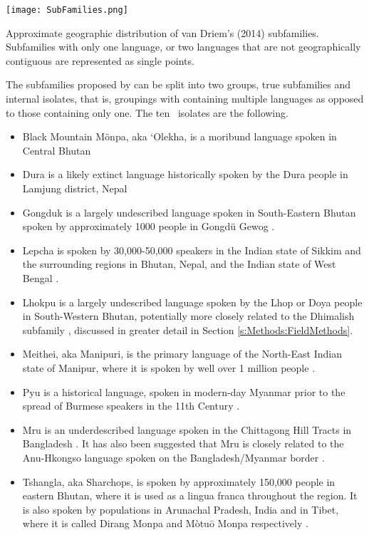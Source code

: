 \begin{map}

\centering
\texttt{[image: SubFamilies.png]}
\caption{Approximate geographic distribution of van Driem's (2014) subfamilies. Subfamilies with only one language, or two languages that are not geographically contiguous are represented as single points.}
\label{fig:SubFamMap}
\end{map}

The subfamilies proposed by  can be split into two groups, true subfamilies and internal isolates, that is, groupings with containing multiple languages as opposed to those containing only one. The ten \lfam\ isolates are the following.


\begin{itemize}
    \item Black Mountain Mönpa, aka `Olekha, is a moribund language spoken in Central Bhutan \cites{vanDriem1995}{Hyslop2016}
    \item Dura is a likely extinct language historically spoken by the Dura people in Lamjung district, Nepal \cite{Schorer2016}
    \item Gongduk is a largely undescribed language spoken in South-Eastern Bhutan spoken by approximately 1000 people in Gongdü Gewog \cite{Bodt2012}.
    \item Lepcha is spoken by 30,000-50,000 speakers in the Indian state of Sikkim and the surrounding regions in Bhutan, Nepal, and the Indian state of West Bengal \cite{Plaisier2007}.
    \item Lhokpu is a largely undescribed language spoken by the Lhop or Doya people in South-Western Bhutan, potentially more closely related to the Dhimalish subfamily \cites{Bodt2012}{Grollmann2018}, discussed in greater detail in Section \ref{s:Methods:FieldMethods}.
    \item Meithei, aka Manipuri, is the primary language of the North-East Indian state of Manipur, where it is spoken by well over 1 million people \cite{Chelliah1997}.
    \item Pyu is a historical language, spoken in modern-day Myanmar prior to the spread of Burmese speakers in the 11th Century \cite{Miyake2019}.
    \item Mru is an underdescribed language spoken in the Chittagong Hill Tracts in Bangladesh \cite{VanDriem2014}. It has also been suggested that Mru is closely related to the Anu-Hkongso language spoken on the Bangladesh/Myanmar border \cite{Peterson2017}.
    \item Tshangla, aka Sharchops, is spoken by approximately 150,000 people in eastern Bhutan, where it is used as a lingua franca throughout the region. It is also spoken by populations in Arunachal Pradesh, India and in Tibet, where it is called Dirang Monpa and Mòtuō Monpa respectively \cites{Andvik2010}{Grollmann2018}.

\end{itemize}
